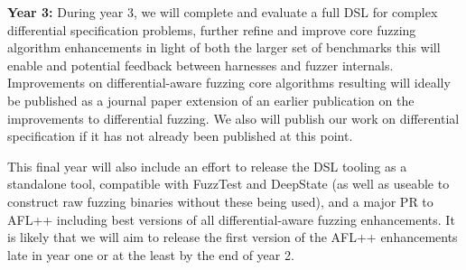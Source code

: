{\bf Year 3:} During year 3, we will complete and evaluate a full DSL
for complex differential specification problems, further refine and
improve core fuzzing algorithm enhancements in light of both the
larger set of benchmarks this will enable and potential feedback
between harnesses and fuzzer internals.  Improvements on
differential-aware fuzzing core algorithms resulting will ideally be
published as a journal paper extension of an earlier publication on
the improvements to differential fuzzing.  We also will publish our work on differential 
specification if it has not already been published at this point.

This final year will also include
an effort to release the DSL tooling as a standalone tool, compatible
with FuzzTest and DeepState (as well as useable to construct raw
fuzzing binaries without these being used), and a major PR to AFL++
including best versions of all differential-aware fuzzing
enhancements.  It is likely that we will aim to release the first
version of the AFL++ enhancements late in year one or at the least by
the end of year 2.  